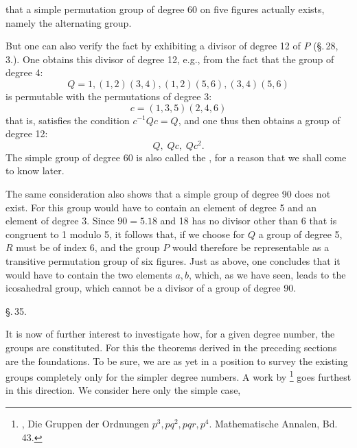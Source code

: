 that a simple permutation group of degree 60 on five figures actually exists, namely the alternating group.

But one can also verify the fact by exhibiting a divisor of degree 12 of $P$ (\S.\,28, 3.). One obtains this divisor of degree 12, e.g., from the fact that the group of degree 4:
\[
Q = 1, (1, 2) (3, 4), (1, 2) (5, 6), (3, 4) (5, 6)
\]
is permutable with the permutations of degree 3:
\[
c = (1, 3, 5) (2, 4, 6)
\]
that is, satisfies the condition $c^{-1} Q c = Q$, and one thus then obtains a group of degree 12:
\[
Q, \; Q c, \; Q c^2.
\]
The simple group of degree 60 is also called the , for a reason that we shall come to know later.

The same consideration also shows that a simple group of degree 90 does not exist. For this group would have to contain an element of degree 5 and an element of degree 3. Since $90 = 5 . 18$ and 18 has no divisor other than 6 that is congruent to 1 modulo 5, it follows that, if we choose for $Q$ a group of degree 5, $R$ must be of index 6, and the group $P$ would therefore be representable as a transitive permutation group of six figures. Just as above, one concludes that it would have to contain the two elements $a, b$, which, as we have seen, leads to the icosahedral group, which cannot be a divisor of a group of degree 90.

\begin{center}
\S.\,35.

\end{center}

It is now of further interest to investigate how, for a given degree number, the groups are constituted. For this the theorems derived in the preceding sections are the foundations. To be sure, we are as yet in a position to survey the existing groups completely only for the simpler degree numbers. A work by \footnote{, Die Gruppen der Ordnungen $p^3, pq^2, pqr, p^4$. Mathematische Annalen, Bd. 43.} goes furthest in this direction. We consider here only the simple case,

